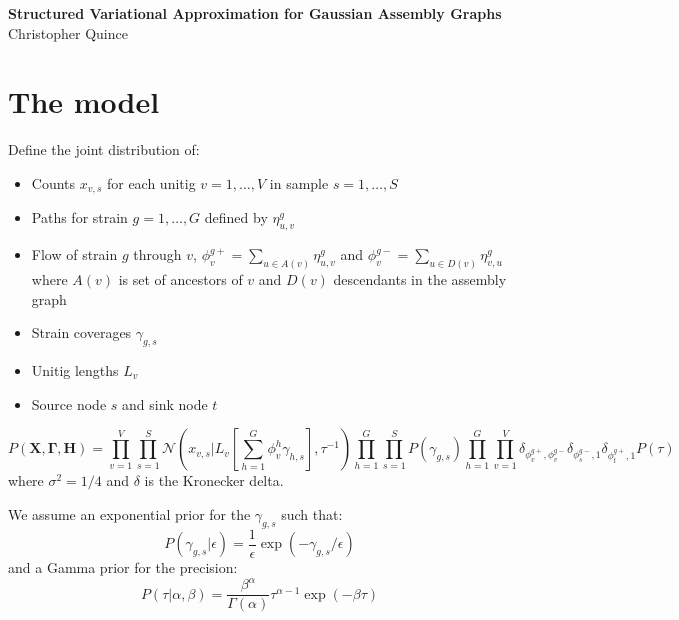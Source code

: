 \documentclass[10pt]{article}
\date{}
\newcommand\titlestring{Structured Variational Approximation for Gaussian Assembly Graphs}
\newcommand\authorstring{Christopher Quince}
\begin{document}
\begin{flushleft}
  {\Large
    \textbf{\titlestring}
  }
\\
\authorstring
\end{flushleft}

\section{The model}

Define the joint distribution of: 
\begin{itemize}

\item Counts $x_{v,s}$ for each unitig $v = 1,\ldots,V$ in sample $s = 1,\ldots,S$

\item Paths for strain $g = 1,\ldots,G$ defined by $\eta^g_{u,v}$

\item Flow of strain $g$ through $v$, $\phi^{g+}_v = \sum_{u \in A(v)} \eta^g_{u,v}$ 
and $\phi^{g-}_v = \sum_{u \in D(v)} \eta^g_{v,u}$ where $A(v)$ is set of ancestors of $v$ 
and $D(v)$ descendants in the assembly graph

\item Strain coverages $\gamma_{g,s}$

\item Unitig lengths $L_v$

\item Source node $s$ and sink node $t$

\end{itemize}

\begin{equation}
P(\mathbf{X},\mathbf{\Gamma},\mathbf{H})  = \prod_{v=1}^V \prod_{s=1}^S \mathcal{N}(x_{v,s}|L_v [\sum_{h=1}^G \phi^h_v \gamma_{h,s}],\tau^{-1}) 
\prod_{h=1}^G \prod_{s=1}^S P(\gamma_{g,s})
\prod_{h=1}^G \prod_{v=1}^V \delta_{ \phi^{g+}_v, \phi^{g-}_v}
 \delta_{\phi^{g-}_s,1}  \delta_{\phi^{g+}_t,1} P(\tau)
\end{equation}
where $\sigma^2 = 1/4$ and $\delta$ is the Kronecker delta.

We assume an exponential prior for the $\gamma_{g,s}$ such that:
\begin{equation}
P(\gamma_{g,s}| \epsilon) = \frac{1}{\epsilon} \exp(-\gamma_{g,s}/\epsilon)
\end{equation}
and a Gamma prior for the precision:
\begin{equation}
P(\tau | \alpha, \beta) = \frac{\beta^\alpha}{\Gamma(\alpha)} \tau^{\alpha - 1} \exp(-\beta \tau)
\end{equation}
\end{document}
